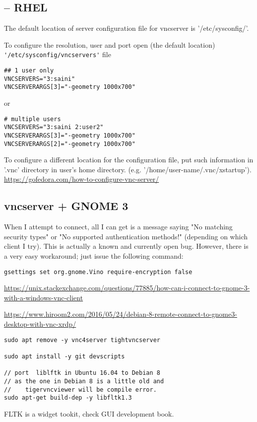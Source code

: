 \subsection{-- RHEL}
\label{sec:vncserver-on-RHEL}

The default location of server configuration file for vncserver is
'/etc/sysconfig/'.

To configure the resolution, user and port open
(the default location) \verb!'/etc/sysconfig/vncservers'! file
\begin{verbatim}
## 1 user only
VNCSERVERS="3:saini"
VNCSERVERARGS[3]="-geometry 1000x700"
\end{verbatim}
or
\begin{verbatim}
# multiple users
VNCSERVERS="3:saini 2:user2"
VNCSERVERARGS[3]="-geometry 1000x700"
VNCSERVERARGS[2]="-geometry 1000x700"
\end{verbatim}

To configure a different location for the configuration file, put such
information in '.vnc' directory in user's home directory. (e.g.
'/home/user-name/.vnc/xstartup').
\url{https://gofedora.com/how-to-configure-vnc-server/}


\subsection{vncserver + GNOME 3}
\label{sec:vncserver-GNOME-3}

When I attempt to connect, all I can get is a message saying "No matching
security types" or "No supported authentication methods!" (depending on which
client I try). This is actually a known and currently open bug. However, there
is a very easy workaround; just issue the following command:
\begin{verbatim}
gsettings set org.gnome.Vino require-encryption false
\end{verbatim}
\url{https://unix.stackexchange.com/questions/77885/how-can-i-connect-to-gnome-3-with-a-windows-vnc-client}



\url{https://www.hiroom2.com/2016/05/24/debian-8-remote-connect-to-gnome3-desktop-with-vnc-xrdp/}
\begin{verbatim}
sudo apt remove -y vnc4server tightvncserver
 
sudo apt install -y git devscripts
  
// port  liblftk in Ubuntu 16.04 to Debian 8
// as the one in Debian 8 is a little old and 
//    tigervncviewer will be compile error.
sudo apt-get build-dep -y libfltk1.3
\end{verbatim}
FLTK is a widget tookit, check GUI development book. 



